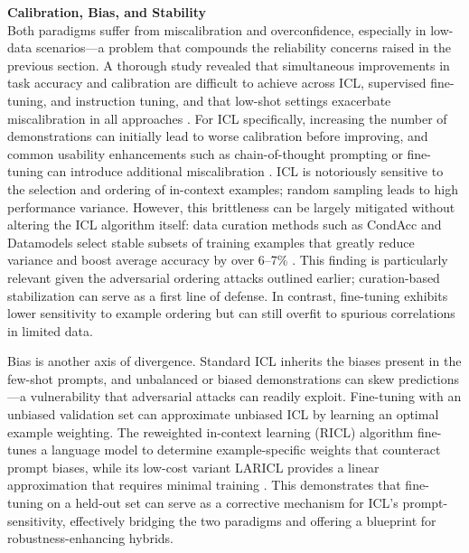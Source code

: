 \documentclass[11pt]{article}
\begin{document}
\textbf{Calibration, Bias, and Stability}\\
Both paradigms suffer from miscalibration and overconfidence, especially in low-data scenarios---a problem that compounds the reliability concerns raised in the previous section. A thorough study revealed that simultaneous improvements in task accuracy and calibration are difficult to achieve across ICL, supervised fine-tuning, and instruction tuning, and that low-shot settings exacerbate miscalibration in all approaches \cite{ref92}. For ICL specifically, increasing the number of demonstrations can initially lead to worse calibration before improving, and common usability enhancements such as chain-of-thought prompting or fine-tuning can introduce additional miscalibration \cite{ref88}. ICL is notoriously sensitive to the selection and ordering of in-context examples; random sampling leads to high performance variance. However, this brittleness can be largely mitigated without altering the ICL algorithm itself: data curation methods such as CondAcc and Datamodels select stable subsets of training examples that greatly reduce variance and boost average accuracy by over 6--7\% \cite{ref76}. This finding is particularly relevant given the adversarial ordering attacks outlined earlier; curation-based stabilization can serve as a first line of defense. In contrast, fine-tuning exhibits lower sensitivity to example ordering but can still overfit to spurious correlations in limited data.

Bias is another axis of divergence. Standard ICL inherits the biases present in the few-shot prompts, and unbalanced or biased demonstrations can skew predictions---a vulnerability that adversarial attacks can readily exploit. Fine-tuning with an unbiased validation set can approximate unbiased ICL by learning an optimal example weighting. The reweighted in-context learning (RICL) algorithm fine-tunes a language model to determine example-specific weights that counteract prompt biases, while its low-cost variant LARICL provides a linear approximation that requires minimal training \cite{ref80}. This demonstrates that fine-tuning on a held-out set can serve as a corrective mechanism for ICL's prompt-sensitivity, effectively bridging the two paradigms and offering a blueprint for robustness-enhancing hybrids.
\end{document}

